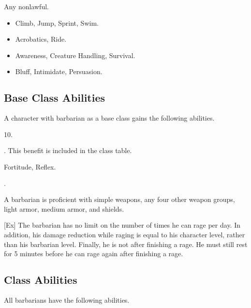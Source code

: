      Any nonlawful.

    \begin{itemize}
        \item {} Climb, Jump, Sprint, Swim.
        \item {} Acrobatics, Ride.
        \item {} Awareness, Creature Handling, Survival.
        \item {} Bluff, Intimidate, Persuasion.
    \end{itemize}

    \subsection{Base Class Abilities}
        A character with barbarian as a base class gains the following abilities.

         10.

         . This benefit is included in the class table.

          Fortitude,  Reflex.

         .

        A barbarian is proficient with simple weapons, any four other weapon groups, light armor, medium armor, and shields.

        [Ex]
        The barbarian has no limit on the number of times he can rage per day.
        In addition, his damage reduction while raging is equal to his character level, rather than his barbarian level.
        Finally, he is not \fatigued after finishing a rage.
        He must still rest for 5 minutes before he can rage again after finishing a rage.

    \subsection{Class Abilities}
        All barbarians have the following abilities.

